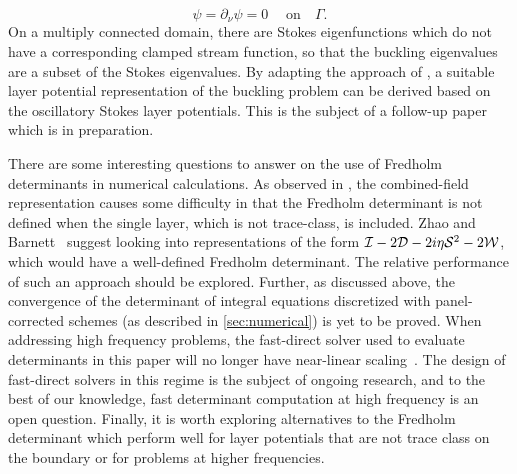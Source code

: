\begin{equation*}
  \psi = \partial_\nu \psi = 0 \; \quad \textrm{on} \quad \Gamma.
\end{equation*}
On a multiply connected domain, there are
Stokes eigenfunctions which do not have a corresponding
clamped stream function, so that the
buckling eigenvalues are a subset of the Stokes
eigenvalues.
By adapting the approach of \cite{rachh2017integral},
a suitable layer potential representation of the
buckling problem can be derived based on the
oscillatory Stokes layer potentials.
%
This is the subject of a follow-up paper which is in
preparation.

There are some interesting questions to answer
on the use of Fredholm determinants in numerical
calculations.
%
As observed in \cite{zhao2015robust}, the
combined-field representation causes some
difficulty in that the Fredholm determinant
is not defined when the single layer, which
is not trace-class, is included.
%
Zhao and Barnett~\cite{zhao2015robust}
suggest looking into
representations of the form $\mathcal I-2{\mathcal D}
-2i\eta{\mathcal S}^2-2{\mathcal W}$,
which would have a well-defined Fredholm
determinant.
%
The relative performance of
such an approach should be explored.
%
Further, as discussed above, the
convergence of the determinant of
integral equations discretized with
panel-corrected schemes (as described in
\cref{sec:numerical}) is yet to be proved.
%
When addressing high frequency problems,
the fast-direct solver used to evaluate
determinants in this paper will no longer
have near-linear scaling~\cite{ho2012fast}.
%
The design of fast-direct solvers in this
regime is the subject of ongoing research, and
to the best of our knowledge, fast determinant
computation at high frequency is an open
question.
%
Finally, it is worth exploring alternatives
to the Fredholm determinant which perform well
for layer potentials that are not trace class
on the boundary or for problems at higher
frequencies.
